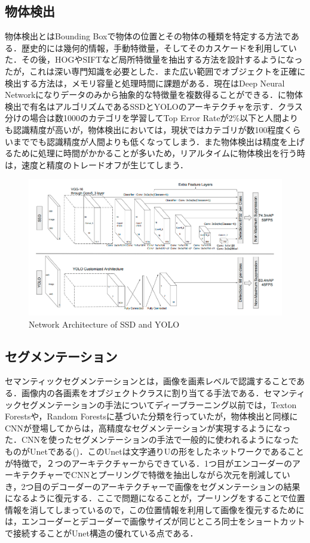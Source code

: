 \subsection*{物体検出}
物体検出とはBounding Boxで物体の位置とその物体の種類を特定する方法である．歴史的には幾何的情報，手動特徴量，そしてそのカスケードを利用していた．その後，HOGやSIFTなど局所特徴量を抽出する方法を設計するようになったが，これは深い専門知識を必要とした．また広い範囲でオブジェクトを正確に検出する方法は，メモリ容量と処理時間に課題がある．現在はDeep Neural Networkになりデータのみから抽象的な特徴量を複数得ることができる．に物体検出で有名はアルゴリズムであるSSDとYOLOのアーキテクチャを示す．クラス分けの場合は数1000のカテゴリを学習してTop Error Rateが2\%以下と人間よりも認識精度が高いが，物体検出においては，現状ではカテゴリが数100程度くらいまででも認識精度が人間よりも低くなってしまう．また物体検出は精度を上げるために処理に時間がかかることが多いため，リアルタイムに物体検出を行う時は，速度と精度のトレードオフが生じてしまう．

\begin{figure}[H]
	\centering
	\includegraphics[width=0.7\linewidth]{fig/yolo_ssd.png}
	\caption{Network Architecture of SSD and YOLO}
	\label{fig:YOLO}
\end{figure}

\subsection*{セグメンテーション}
セマンティックセグメンテーションとは，画像を画素レベルで認識することである．画像内の各画素をオブジェクトクラスに割り当てる手法である．セマンティックセグメンテーションの手法についてディープラーニング以前では，Texton Forestsや，Random Forestsに基づいた分類を行っていたが，物体検出と同様にCNNが登場してからは，高精度なセグメンテーションが実現するようになった．CNNを使ったセグメンテーションの手法で一般的に使われるようになったものがUnetである()．このUnetは文字通りUの形をしたネットワークであることが特徴で，２つのアーキテクチャーからできている．1つ目がエンコーダーのアーキテクチャーでCNNとプーリングで特徴を抽出しながら次元を削減していき，2つ目のデコーダーのアーキテクチャーで画像をセグメンテーションの結果になるように復元する．ここで問題になることが，プーリングをすることで位置情報を消してしまっているので，この位置情報を利用して画像を復元するためには，エンコーダーとデコーダーで画像サイズが同じところ同士をショートカットで接続することがUnet構造の優れている点である．

